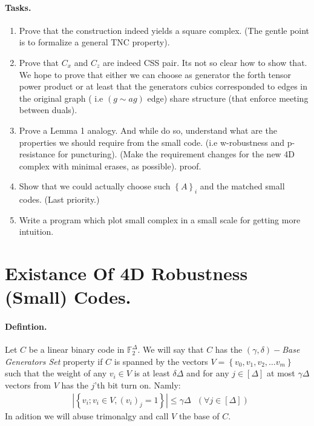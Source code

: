 \documentclass{article}
\begin{document}
\begin{multicols*}{2}
\paragraph{Tasks.}
	\begin{enumerate}
	  \item Prove that the construction indeed yields a square complex. (The gentle point is to formalize a general TNC property).  
	  \item Prove that $C_{x}$ and $C_{z}$ are indeed CSS pair. Its not so clear how to show that. We hope to prove that either we can choose as generator the forth tensor power product or at least that the generators cubics corresponded to edges in the original graph ( i.e $ \left( g \sim ag  \right) $ edge) share structure (that enforce meeting between duals).
	  \item Prove a Lemma 1 analogy. And while do so, understand what are the properties we should require from the small code.  
	    (i.e w-robustness and p-resistance for puncturing). 
	    (Make the requirement changes for the new 4D complex with minimal erases, as possible).
	proof. 
	  \item Show that we could actually choose such $\left\{ A \right\}_{i}$ and the matched small codes. (Last priority.) 
	  \item Write a program which plot small complex in a small scale for getting more intuition.  
	\end{enumerate}
	\section{Existance Of 4D Robustness (Small) Codes.} 
	\paragraph{Defintion.} Let $C$ be a linear binary code in $\mathbb{F}^{\Delta}_{2}$. We will say that $C$ has the $\left( \gamma,\delta \right)-$\textit{Base Generators Set} property if $C$ is spanned by the vectors $V = \left\{v_{0},v_{1},v_{2},\dots v_{m}  \right\} $ such that the weight of any $v_{i}\in V$ is at least $\delta\Delta$ and for any $j \in [\Delta]$ at most $\gamma\Delta$ vectors from $V$ has the $j$'th bit turn on. Namly:
	\begin{equation*}
	  \begin{split}
	    & | \left\{ v_{i}; v_{i}\in V , \left( v_{i} \right)_{j} = 1  \right\} | \le \gamma\Delta \ \ \ \left( \forall j \in \left[ \Delta \right] \right)
	  \end{split}
	\end{equation*} In adition we will abuse trimonalgy and call $V$ the base of $C$.  

\end{multicols*}
\end{document}
